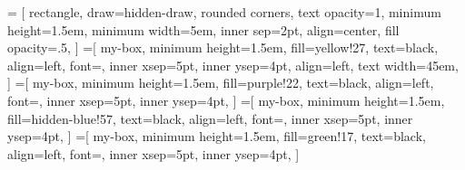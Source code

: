 = [
    rectangle,
    draw=hidden-draw,
    rounded corners,
    text opacity=1,
    minimum height=1.5em,
    minimum width=5em,
    inner sep=2pt,
    align=center,
    fill opacity=.5,
]
=[
my-box, 
minimum height=1.5em,
fill=yellow!27, 
text=black,
align=left,
font=\scriptsize,
inner xsep=5pt,
inner ysep=4pt,
align=left,
text width=45em,
]
=[
my-box, 
minimum height=1.5em,
fill=purple!22, 
text=black,
align=left,
font=\scriptsize,
inner xsep=5pt,
inner ysep=4pt,
]
=[
my-box, 
minimum height=1.5em,
fill=hidden-blue!57, 
text=black,
align=left,
font=\scriptsize,
inner xsep=5pt,
inner ysep=4pt,
]
=[
my-box, 
minimum height=1.5em,
fill=green!17, 
text=black,
align=left,
font=\scriptsize,
inner xsep=5pt,
inner ysep=4pt,
]
